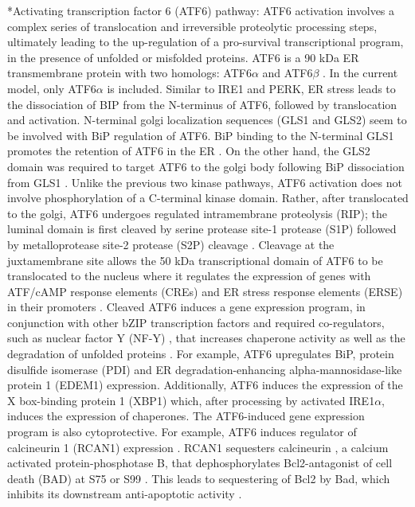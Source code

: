 \documentclass[12pt]{article}
\makeatletter
\renewcommand\subsection{\@startsection
	{subsection}{2}{0mm}
	{-0.05in}
	{-0.5\baselineskip}
	{\normalfont\normalsize\bfseries}}
\makeatother
\begin{document}
\subsection*{Activating transcription factor 6 (ATF6) pathway:} ATF6 activation involves a complex series of translocation and irreversible proteolytic processing steps, ultimately leading to the up-regulation of a pro-survival transcriptional program, in the presence of unfolded or misfolded proteins. ATF6 is a 90 kDa ER transmembrane protein with two homologs: ATF6$\alpha$ \citep{silver1999mtf,hai1989tfa} and ATF6$\beta$ \citep{min1995ncf,khanna1996ggc,kyosuke2001igc}. In the current model, only ATF6$\alpha$ is included. Similar to IRE1 and PERK, ER stress leads to the dissociation of BIP from the N-terminus of ATF6, followed by translocation and activation. N-terminal golgi localization sequences (GLS1 and GLS2) seem to be involved with BiP regulation of ATF6. BiP binding to the N-terminal GLS1 promotes the retention of ATF6 in the ER \citep{shen2002esr}. On the other hand, the GLS2 domain was required to target ATF6 to the golgi body following BiP dissociation from GLS1 \citep{shen2002esr}. Unlike the previous two kinase pathways, ATF6 activation does not involve phosphorylation of a C-terminal kinase domain. Rather, after translocated to the golgi, ATF6 undergoes regulated intramembrane proteolysis (RIP); the luminal domain is first cleaved by serine protease site-1 protease (S1P) followed by metalloprotease site-2 protease (S2P) cleavage \citep{silver1999mtf,ye2000esi,chen2002lda,shen2004dsp}. Cleavage at the juxtamembrane site allows the 50 kDa transcriptional domain of ATF6 to be translocated to the nucleus where it regulates the expression of genes with ATF/cAMP response elements (CREs) \citep{wang2000aaa} and  ER stress response elements (ERSE) in their promoters \citep{yoshida1998ica, kokame2001iei}. Cleaved ATF6 induces a gene expression program, in conjunction with other bZIP transcription factors and required co-regulators, such as nuclear factor Y (NF-Y) \citep{kokame2001iei,yoshida2000aap}, that increases chaperone activity as well as the degradation of unfolded proteins \citep{yamamoto2007tim,wu2007aol}. For example, ATF6 upregulates BiP, protein disulfide isomerase (PDI) and ER degradation-enhancing alpha-mannosidase-like protein 1 (EDEM1) expression. Additionally, ATF6 induces the expression of the X box-binding protein 1 (XBP1) which, after processing by activated IRE1$\alpha$, induces the expression of chaperones. The ATF6-induced gene expression program is also cytoprotective. For example, ATF6 induces regulator of calcineurin 1 (RCAN1) expression \citep{belmont2008cga}. RCAN1 sequesters calcineurin \citep{belmont2008cga}, a calcium activated protein-phosphotase B, that dephosphorylates Bcl2-antagonist of cell death (BAD) at S75 or S99 \citep{wang1999cia}. This leads to sequestering of Bcl2 by Bad, which inhibits its downstream anti-apoptotic activity \citep{wang1999cia}.
\end{document}
